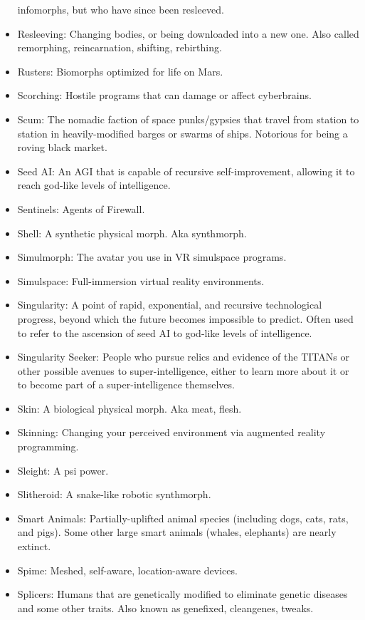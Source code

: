 \begin{itemize}
  infomorphs, but who have since been resleeved.
\item Resleeving: Changing bodies, or being downloaded into a new
  one. Also called remorphing, reincarnation, shifting, rebirthing.
\item Rusters: Biomorphs optimized for life on Mars.
\item Scorching: Hostile programs that can damage or affect
  cyberbrains.
\item Scum: The nomadic faction of space punks/gypsies that travel
  from station to station in heavily-modified barges or swarms of
  ships. Notorious for being a roving black market.
\item Seed AI: An AGI that is capable of recursive self-improvement,
  allowing it to reach god-like levels of intelligence.
\item Sentinels: Agents of Firewall.
\item Shell: A synthetic physical morph. Aka synthmorph.
\item Simulmorph: The avatar you use in VR simulspace programs.
\item Simulspace: Full-immersion virtual reality environments.
\item Singularity: A point of rapid, exponential, and recursive
  technological progress, beyond which the future becomes impossible
  to predict. Often used to refer to the ascension of seed AI to
  god-like levels of intelligence.
\item Singularity Seeker: People who pursue relics and evidence of the
  TITANs or other possible avenues to super-intelligence, either to
  learn more about it or to become part of a super-intelligence
  themselves.
\item Skin: A biological physical morph. Aka meat, flesh.
\item Skinning: Changing your perceived environment via augmented
  reality programming.
\item Sleight: A psi power.
\item Slitheroid: A snake-like robotic synthmorph.
\item Smart Animals: Partially-uplifted animal species (including
  dogs, cats, rats, and pigs). Some other large smart animals (whales,
  elephants) are nearly extinct.
\item Spime: Meshed, self-aware, location-aware devices.
\item Splicers: Humans that are genetically modified to eliminate
  genetic diseases and some other traits. Also known as genefixed,
  cleangenes, tweaks.

\end{itemize}
